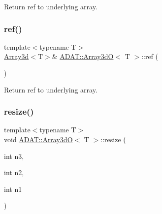 Return ref to underlying array. 

\mbox{\label{classADAT_1_1Array3dO_ad56a8ea2aac56eba9b8b74af06e79970}} 
\subsubsection{\texorpdfstring{ref()}{ref()}\hspace{0.1cm}{\footnotesize\ttfamily [6/6]}}
{\footnotesize\ttfamily template$<$typename T$>$ \\
\mbox{\hyperlink{classXMLArray_1_1Array3d}{Array3d}}$<$T$>$\& \mbox{\hyperlink{classADAT_1_1Array3dO}{A\+D\+A\+T\+::\+Array3dO}}$<$ T $>$\+::ref (\begin{DoxyParamCaption}{ }\end{DoxyParamCaption})\hspace{0.3cm}{\ttfamily [inline]}}



Return ref to underlying array. 

\mbox{\label{classADAT_1_1Array3dO_ac2ad038aba5cf35770c319cb199cd438}} 
\subsubsection{\texorpdfstring{resize()}{resize()}\hspace{0.1cm}{\footnotesize\ttfamily [1/6]}}
{\footnotesize\ttfamily template$<$typename T$>$ \\
void \mbox{\hyperlink{classADAT_1_1Array3dO}{A\+D\+A\+T\+::\+Array3dO}}$<$ T $>$\+::resize (\begin{DoxyParamCaption}\item[{int}]{n3,  }\item[{int}]{n2,  }\item[{int}]{n1 }\end{DoxyParamCaption})\hspace{0.3cm}{\ttfamily [inline]}}

\mbox{\label{classADAT_1_1Array3dO_ac2ad038aba5cf35770c319cb199cd438}} 
